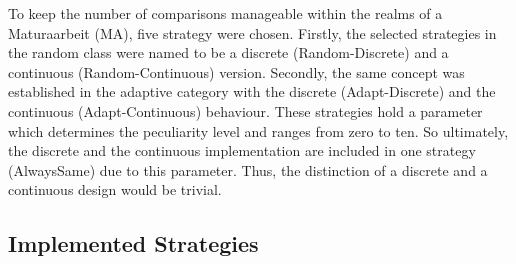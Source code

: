 \documentclass[11pt]{article}
\begin{document}
To keep the number of comparisons manageable within the realms of a Maturaarbeit (MA), five strategy were chosen.
Firstly, the selected strategies in the random class were named to be a discrete (Random-Discrete) and a continuous (Random-Continuous) version.
Secondly, the same concept was established in the adaptive category with the discrete (Adapt-Discrete) and the continuous (Adapt-Continuous) behaviour.
These strategies hold a parameter which determines the peculiarity level and ranges from zero to ten.
So ultimately, the discrete and the continuous implementation are included in one strategy (AlwaysSame) due to this parameter.
Thus, the distinction of a discrete and a continuous design would be trivial.\\


%
%

\subsection{Implemented Strategies}
\end{document}
